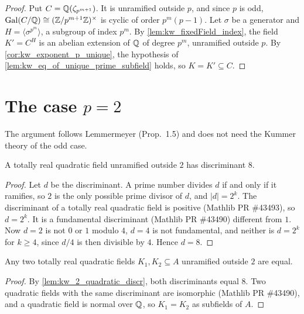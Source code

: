 \begin{proof}
  \leanok
  Put $C = \mathbb{Q}(\zeta_{p^{m+1}})$. It is unramified outside $p$, and since $p$ is odd,
  $\mathrm{Gal}(C/\mathbb{Q}) \cong (\mathbb{Z}/p^{m+1}\mathbb{Z})^\times$ is cyclic of order $p^{m}(p-1)$. Let $\sigma$ be a
  generator and $H = \langle \sigma^{p^m}\rangle$, a subgroup of index $p^m$. By
  \ref{lem:kw_fixedField_index}, the field $K' = C^{H}$ is an abelian extension of $\mathbb{Q}$ of degree
  $p^m$, unramified outside $p$. By \ref{cor:kw_exponent_p_unique}, the hypothesis of
  \ref{lem:kw_eq_of_unique_prime_subfield} holds, so $K = K' \subseteq C$.
\end{proof}

\section{The case $p = 2$}

The argument follows Lemmermeyer (Prop.~1.5) and does not need the Kummer theory of the odd
case.

\begin{lemma}
  \label{lem:kw_2_quadratic_discr}
  \leanok
  A totally real quadratic field unramified outside $2$ has discriminant $8$.
\end{lemma}

\begin{proof}
  \leanok
  Let $d$ be the discriminant. A prime number divides $d$ if and only if it ramifies, so $2$ is
  the only possible prime divisor of $d$, and $|d| = 2^k$. The discriminant of a totally real
  quadratic field is positive (Mathlib PR \#43493), so $d = 2^k$. It is a fundamental discriminant
  (Mathlib PR \#43490) different from $1$. Now $d = 2$ is not $0$ or $1$ modulo $4$, $d = 4$ is
  not fundamental, and neither is $d = 2^k$ for $k \geq 4$, since $d/4$ is then divisible by $4$.
  Hence $d = 8$.
\end{proof}

\begin{proposition}
  \label{prop:kw_2_quadratic_real_unique}
  \leanok
  Any two totally real quadratic fields $K_1, K_2 \subseteq A$ unramified outside $2$ are equal.
\end{proposition}

\begin{proof}
  \leanok
  By \ref{lem:kw_2_quadratic_discr}, both discriminants equal $8$. Two quadratic fields with the
  same discriminant are isomorphic (Mathlib PR \#43490), and a quadratic field is normal over
  $\mathbb{Q}$, so $K_1 = K_2$ as subfields of $A$.
\end{proof}


